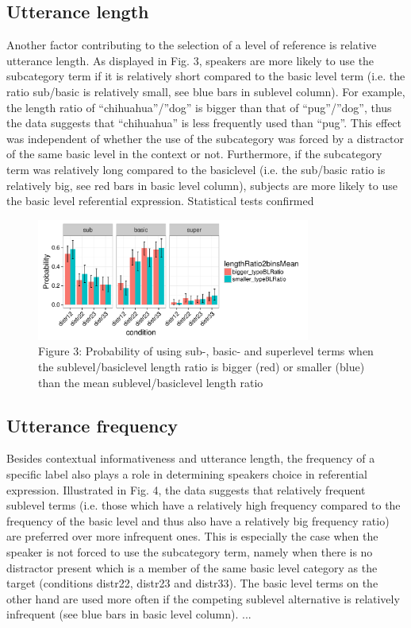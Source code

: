 \documentclass[10pt,letterpaper]{article}
\begin{document}
\subsection{\bf Utterance length}
Another factor contributing to the selection of a level of reference is relative utterance length. As displayed in Fig. 3, speakers are more likely to use the subcategory term if it is relatively short compared to the basic level term (i.e. the ratio sub/basic is relatively small, see blue bars in sublevel column). For example, the length ratio of “chihuahua”/”dog” is bigger than that of “pug”/”dog”, thus the data suggests that “chihuahua” is less frequently used than “pug”. This effect was independent of whether the use of the subcategory was forced by a distractor of the same basic level in the context or not. Furthermore, if the subcategory term was relatively long compared to the basiclevel (i.e. the sub/basic ratio is relatively big, see red bars in basic level column), subjects are more likely to use the basic level referential expression. Statistical tests confirmed

\begin{figure}[ht!]
\centering
\includegraphics[width=90mm]{graphs/lengthRatio.pdf}
\caption{Figure 3: Probability of using sub-, basic- and superlevel terms when the sublevel/basiclevel length ratio is bigger (red) or smaller (blue) than the mean  sublevel/basiclevel length ratio \label{overflow}}
\end{figure}

\subsection{\bf Utterance frequency}
Besides contextual informativeness and utterance length, the frequency of a specific label also plays a role in determining speakers choice in referential expression. Illustrated in Fig. 4, the data suggests that relatively frequent sublevel terms (i.e. those which have a relatively high frequency compared to the frequency of the basic level and thus also have a relatively big frequency ratio) are preferred over more infrequent ones. This is especially the case when the speaker is not forced to use the subcategory term, namely when there is no distractor present which is a member of the same basic level category as the target (conditions distr22, distr23 and distr33). The basic level terms on the other hand are used more often if the competing sublevel alternative is relatively infrequent (see blue bars in basic level column). ...
\end{document}
